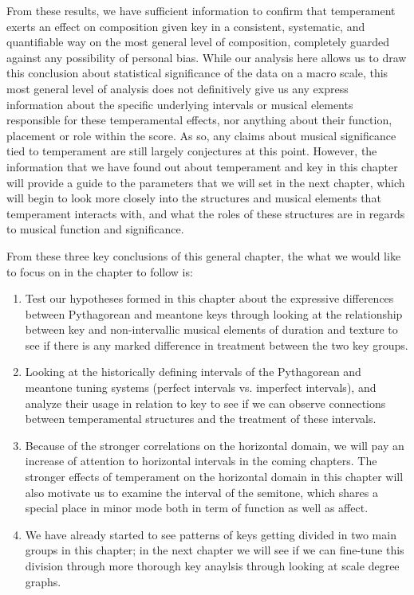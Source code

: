 From these results, we have sufficient information to confirm that
temperament exerts an effect on composition given key in a consistent,
systematic, and quantifiable way on the most general level of
composition, completely guarded against any possibility of personal
bias. While our analysis here allows us to draw this conclusion about
statistical significance of the data on a macro scale, this most general
level of analysis does not definitively give us any express information
about the specific underlying intervals or musical elements responsible
for these temperamental effects, nor anything about their function,
placement or role within the score. As so, any claims about musical
significance tied to temperament are still largely conjectures at this
point. However, the information that we have found out about temperament
and key in this chapter will provide a guide to the parameters that we
will set in the next chapter, which will begin to look more closely into
the structures and musical elements that temperament interacts with, and
what the roles of these structures are in regards to musical function
and significance.

From these three key conclusions of this general chapter, the what we
would like to focus on in the chapter to follow is:

\begin{enumerate}
\def\labelenumi{\arabic{enumi}.}
\tightlist
\item
  Test our hypotheses formed in this chapter about the expressive
  differences between Pythagorean and meantone keys through looking at
  the relationship between key and non-intervallic musical elements of
  duration and texture to see if there is any marked difference in
  treatment between the two key groups.
\item
  Looking at the historically defining intervals of the Pythagorean and
  meantone tuning systems (perfect intervals vs. imperfect intervals),
  and analyze their usage in relation to key to see if we can observe
  connections between temperamental structures and the treatment of
  these intervals.
\item
  Because of the stronger correlations on the horizontal domain, we will
  pay an increase of attention to horizontal intervals in the coming
  chapters. The stronger effects of temperament on the horizontal domain
  in this chapter will also motivate us to examine the interval of the
  semitone, which shares a special place in minor mode both in term of
  function as well as affect.
\item
  We have already started to see patterns of keys getting divided in two
  main groups in this chapter; in the next chapter we will see if we can
  fine-tune this division through more thorough key anaylsis through
  looking at scale degree graphs.
\end{enumerate}


    
    
    
